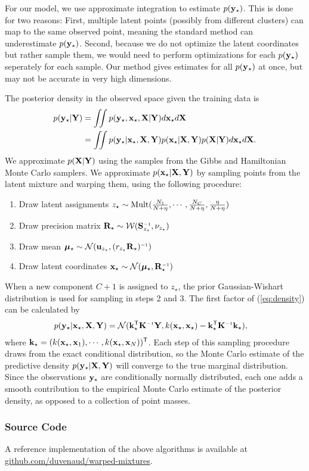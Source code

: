 For our model, we use approximate integration to estimate $p({\bf{y}}_\star)$.
This is done for two reasons:
First, multiple latent points (possibly from different clusters) can map to the same observed point, meaning the standard method can underestimate $p({\bf{y}}_\star)$.
Second, because we do not optimize the latent coordinates but rather sample them, we would need to perform optimizations for each $p({\bf{y}}_\star)$ seperately for each sample.
Our method gives estimates for all $p({\bf{y}}_\star)$ at once, but may not be accurate in very high dimensions.

The posterior density in the observed space given the training data is
\begin{align}
p({\bf{y}}_\star | \mathbf{Y})
& = \int \!\!\! \int p({\bf{y}}_\star,{\bf{x}}_\star, \mathbf{X} | \mathbf{Y})d{\bf{x}}_\star d\mathbf{X} \nonumber\\
& = \int\!\!\! \int p({\bf{y}}_\star | {\bf{x}}_\star, \mathbf{X}, \mathbf{Y})p({\bf{x}}_\star|\mathbf{X},\mathbf{Y})p(\mathbf{X}|\mathbf{Y})d{\bf{x}}_\star d\mathbf{X}.
\label{eq:density}
\end{align}
We approximate $p(\mathbf{X} | \mathbf{Y})$ using the samples from the Gibbs and Hamiltonian Monte Carlo samplers.
We approximate $p({\bf{x}}_\star | \mathbf{X}, \mathbf{Y})$ by sampling points from the latent mixture and warping them, using the following procedure:
\begin{enumerate}
\item Draw latent assignments
$z_\star \sim {\rm Mult}(\frac{N_{1}}{N+\eta},\cdots,\frac{N_{C}}{N+\eta},\frac{\eta}{N+\eta})$
\item Draw precision matrix
$\vR_\star \sim {\cal W}(\vS\inv_{z_\star},\nu_{z_\star})$
\item Draw mean
$\vmu_\star \sim {\cal N}(\vu_{z_\star},(r_{z_\star}\vR_\star)\inv)$
\item Draw latent coordinates
$\vx_\star \sim {\cal N}(\vmu_\star,\vR_\star\inv)$
\end{enumerate}
%
When a new component $C+1$ is assigned to $z_\star$, the prior Gaussian-Wishart distribution is used for sampling in steps 2 and 3.
The first factor of (\ref{eq:density}) can be calculated by
%
\begin{align}
p(\vy_\star | \vx_\star, \vX, \vY)
& = {\cal N}(\vk_\star\tra \vK\inv \vY, k(\vx_\star,\vx_\star)-\vk_\star\tra \vK\inv \vk_\star),
\end{align}
%
where
%
${\bf{k}}_\star=( k({\bf{x}}_\star, {\bf{x}}_1), \cdots, k({\bf{x}}_\star, {\bf{x}}_N))^{\mathsf{T}}$.
%  
Each step of this sampling procedure draws from the exact conditional distribution, so the Monte Carlo estimate of the predictive density $p({\bf{y}}_\star | \mathbf{X}, \mathbf{Y})$ will converge to the true marginal distribution.
Since the observations ${\bf{y}}_\star$ are conditionally normally distributed, each one adds a smooth contribution to the empirical Monte Carlo estimate of the posterior density, as opposed to a collection of point masses.

\subsubsection{Source Code}

A reference implementation of the above algorithms is available at \url{github.com/duvenaud/warped-mixtures}.

\outbpdocument{


}

